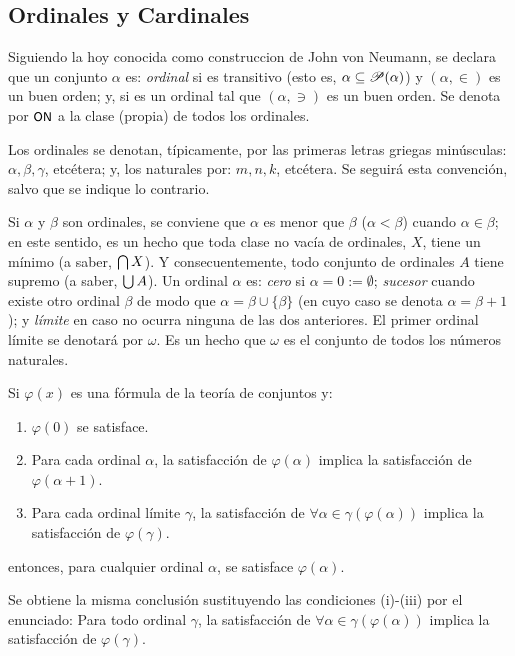     \subsection{Ordinales y Cardinales}

    \index[sym]{$\OR$}
    Siguiendo la hoy conocida como construccion de John von Neumann, se declara que un conjunto $\alpha$ es: \textit{ordinal} si es transitivo (esto es, $\alpha \subseteq \mathscr{P}(\alpha)$) y $(\alpha,\in)$ es un buen orden; y,  si es un ordinal tal que $(\alpha,\ni)$ es un buen orden. Se denota por $\OR$ a la clase (propia) de todos los ordinales.

    Los ordinales se denotan, típicamente, por las primeras letras griegas minúsculas: $\alpha, \beta, \gamma$, etcétera; y, los naturales por: $m,n,k$, etcétera. Se seguirá esta convención, salvo que se indique lo contrario.

    \index[sym]{$\omega$}\index[sym]{$\alpha < \beta$}
    Si $\alpha$ y $\beta$ son ordinales, se conviene que $\alpha$ es menor que $\beta$ ($\alpha<\beta$) cuando $\alpha \in \beta$; en este sentido, es un hecho que toda clase no vacía de ordinales, $X$, tiene un mínimo (a saber, $\mbox{$\bigcap$}\, X$). Y consecuentemente, todo conjunto de ordinales $A$ tiene supremo (a saber, $\mbox{$\bigcup$}\, A$). Un ordinal $\alpha$ es: \textit{cero} si $\alpha=0:=\emptyset$; \textit{sucesor} cuando existe otro ordinal $\beta$ de modo que $\alpha = \beta \cup \{\beta\}$ (en cuyo caso se denota $\alpha=\beta+1$); y \textit{límite} en caso no ocurra ninguna de las dos anteriores. El primer ordinal límite se denotará por $\omega$. Es un hecho que $\omega$ es el conjunto de todos los números naturales.
    
    \begin{teorema}
        Si $\varphi(x)$ es una fórmula de la teoría de conjuntos y:
        \begin{enumerate}
            \item $\varphi(0)$ se satisface.
            \item Para cada ordinal $\alpha$, la satisfacción de $\varphi(\alpha)$ implica la satisfacción de $\varphi(\alpha+1)$.
            \item Para cada ordinal límite $\gamma$, la satisfacción de $\forall \alpha \in \gamma (\varphi(\alpha))$ implica la satisfacción de $\varphi(\gamma)$.
        \end{enumerate}
        entonces, para cualquier ordinal $\alpha$, se satisface $\varphi(\alpha)$.

        Se obtiene la misma conclusión sustituyendo las condiciones (i)-(iii) por el enunciado: Para todo ordinal $\gamma$, la satisfacción de $\forall \alpha \in \gamma (\varphi(\alpha))$ implica la satisfacción de $\varphi(\gamma)$.
    \end{teorema}

